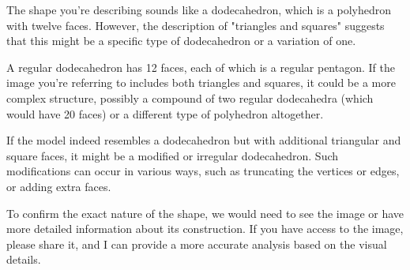 The shape you're describing sounds like a dodecahedron, which is a polyhedron with twelve faces. However, the description of "triangles and squares" suggests that this might be a specific type of dodecahedron or a variation of one.

A regular dodecahedron has 12 faces, each of which is a regular pentagon. If the image you're referring to includes both triangles and squares, it could be a more complex structure, possibly a compound of two regular dodecahedra (which would have 20 faces) or a different type of polyhedron altogether.

If the model indeed resembles a dodecahedron but with additional triangular and square faces, it might be a modified or irregular dodecahedron. Such modifications can occur in various ways, such as truncating the vertices or edges, or adding extra faces.

To confirm the exact nature of the shape, we would need to see the image or have more detailed information about its construction. If you have access to the image, please share it, and I can provide a more accurate analysis based on the visual details.